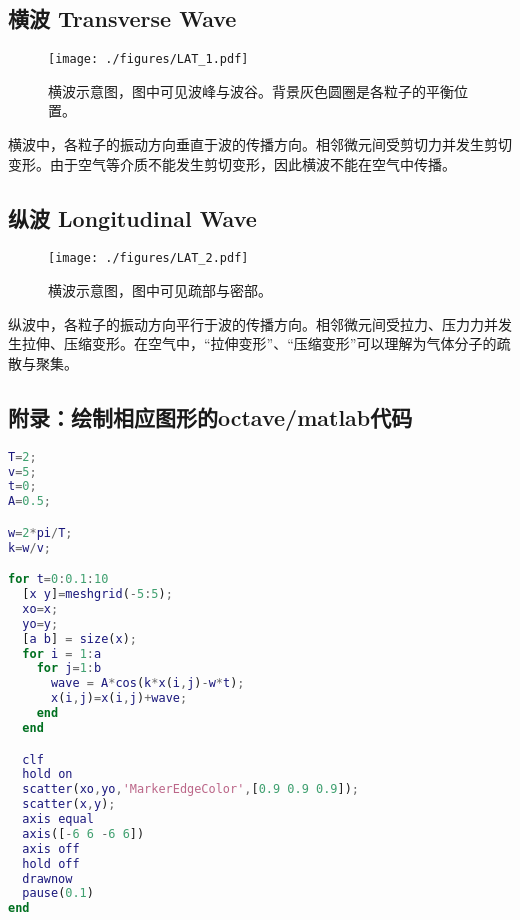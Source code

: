 
\subsection{横波 Transverse Wave}
\begin{figure}[ht]
\centering
\texttt{[image: ./figures/LAT\_1.pdf]}
\caption{横波示意图，图中可见波峰与波谷。背景灰色圆圈是各粒子的平衡位置。} \label{LAT_fig1}
\end{figure}
横波中，各粒子的振动方向垂直于波的传播方向。相邻微元间受剪切力并发生剪切变形。由于空气等介质不能发生剪切变形，因此横波不能在空气中传播。

\subsection{纵波 Longitudinal Wave}
\begin{figure}[ht]
\centering
\texttt{[image: ./figures/LAT\_2.pdf]}
\caption{横波示意图，图中可见疏部与密部。} \label{LAT_fig2}
\end{figure}
纵波中，各粒子的振动方向平行于波的传播方向。相邻微元间受拉力、压力力并发生拉伸、压缩变形。在空气中，“拉伸变形”、“压缩变形”可以理解为气体分子的疏散与聚集。

\subsection{附录：绘制相应图形的octave/matlab代码}
\begin{lstlisting}[language=matlab]
%绘制横波
T=2;
v=5;
t=0;
A=0.5;

w=2*pi/T;
k=w/v;

for t=0:0.1:10
  [x y]=meshgrid(-5:5);
  xo=x;
  yo=y;
  [a b] = size(x);
  for i = 1:a
    for j=1:b
      wave = A*cos(k*x(i,j)-w*t);
      x(i,j)=x(i,j)+wave;
    end
  end

  clf
  hold on
  scatter(xo,yo,'MarkerEdgeColor',[0.9 0.9 0.9]);
  scatter(x,y);
  axis equal
  axis([-6 6 -6 6])
  axis off
  hold off
  drawnow
  pause(0.1)
end
\end{lstlisting}
